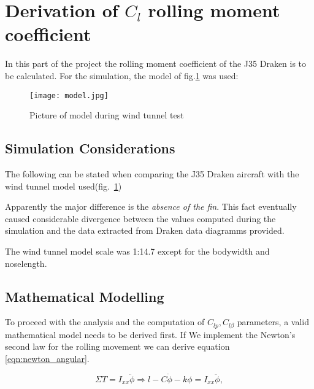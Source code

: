 \section{Derivation of $C_{l}$ rolling moment coefficient}
In this part of the project the rolling moment coefficient of the J35 Draken is to be calculated.
For the simulation, the model of fig.\ref{fig:model} was used:

\begin{figure}[H]
    \begin{center}
        \texttt{[image: model.jpg]} %
    \end{center}
    \caption{Picture of model during wind tunnel test}
    \label{fig:model}
\end{figure}

\subsection{Simulation Considerations}

The following can be stated when comparing the J35 Draken aircraft with the wind tunnel model used(fig.~\ref{fig:model})
\begin{itemize*}
    \item Apparently the major difference is the \textit{absence of the fin}. 
        This fact eventually caused considerable divergence between the values computed during the 
        simulation and the data extracted from Draken data diagramms provided.
    \item The wind tunnel model scale was 1:14.7 except for the bodywidth
        and noselength. 
\end{itemize*}


\subsection{Mathematical Modelling}
To proceed with the analysis and the computation of $C_{lp}, C_{l\beta}$ parameters, 
a valid mathematical model needs to be derived first. 
If We implement the Newton's second law for the rolling movement
we can derive equation \ref{eqn:newton_angular}.

\begin{equation}
    \Sigma T = I_{xx}\ddot{\phi} \Rightarrow 
    l - C\dot{\phi} - k\phi = I_{xx}\ddot{\phi},
    \label{eqn:newton_angular}
\end{equation}

%
%
%
%
%
%
%
%
%
%

